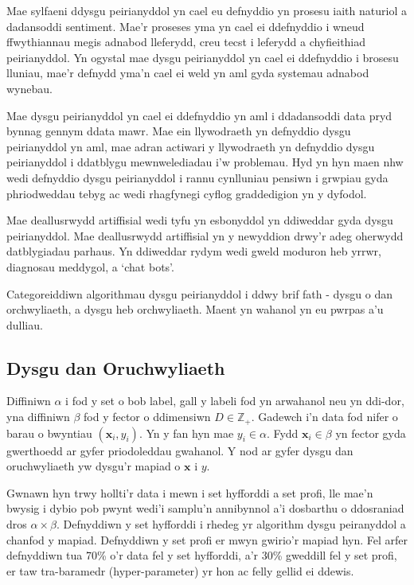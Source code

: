 Mae sylfaeni ddysgu peirianyddol yn cael eu defnyddio yn prosesu iaith naturiol a dadansoddi sentiment\cite{technolegau-iaith}. Mae'r proseses yma yn cael ei ddefnyddio i wneud ffwythiannau megis adnabod lleferydd, creu tecst i leferydd a chyfieithiad peirianyddol.
Yn ogystal mae dysgu peirianyddol yn cael ei ddefnyddio i brosesu lluniau, mae'r defnydd yma'n cael ei weld yn aml gyda systemau adnabod wynebau.

Mae dysgu peirianyddol yn cael ei ddefnyddio yn aml i ddadansoddi data pryd bynnag gennym ddata mawr. Mae ein llywodraeth yn defnyddio dysgu peirianyddol yn aml, mae adran actiwari y llywodraeth yn defnyddio dysgu peirianyddol i ddatblygu mewnwelediadau i'w problemau. Hyd yn hyn maen nhw wedi defnyddio dysgu peirianyddol i rannu cynlluniau pensiwn i grwpiau gyda phriodweddau tebyg ac wedi rhagfynegi cyflog graddedigion yn y dyfodol. \cite{GAD}  

Mae deallusrwydd artiffisial wedi tyfu yn esbonyddol yn ddiweddar gyda dysgu peirianyddol. Mae deallusrwydd artiffisial yn y newyddion drwy'r adeg oherwydd datblygiadau parhaus. Yn ddiweddar rydym wedi gweld moduron heb yrrwr, diagnosau meddygol, a `chat bots'.

Categoreiddiwn algorithmau dysgu peirianyddol i ddwy brif fath - dysgu o dan orchwyliaeth, a dysgu heb orchwyliaeth. Maent yn wahanol yn eu pwrpas a'u dulliau.

\subsection{Dysgu dan Oruchwyliaeth}

Diffiniwn $\alpha$ i fod y set o bob label, gall y labeli fod yn arwahanol neu yn ddi-dor, yna diffiniwn $\beta$ fod y fector o ddimensiwn $D \in \mathbb{Z}_{+}$. Gadewch i'n data fod nifer o barau o bwyntiau $(\mathbf{x}_{i},y_{i})$. Yn y fan hyn mae $y_{i} \in \alpha$. Fydd $\mathbf{x}_{i} \in  \beta$ yn fector gyda gwerthoedd ar gyfer priodoleddau gwahanol. Y nod ar gyfer dysgu dan oruchwyliaeth yw dysgu'r mapiad o $\mathbf{x}$ i $y$.\cite{dysgu-peirianyddol}

Gwnawn hyn trwy hollti'r data i mewn i set hyfforddi a set profi, lle mae'n bwysig i dybio pob pwynt wedi'i samplu'n annibynnol a'i dosbarthu o ddosraniad dros $\alpha \times \beta$. Defnyddiwn y set hyfforddi i rhedeg yr algorithm dysgu peiranyddol a chanfod y mapiad. Defnyddiwn y set profi er mwyn gwirio'r mapiad hyn. Fel arfer defnyddiwn tua 70\% o'r data fel y set hyfforddi, a'r 30\% gweddill fel y set profi, er taw tra-baramedr (hyper-parameter) yr hon ac felly gellid ei ddewis.

